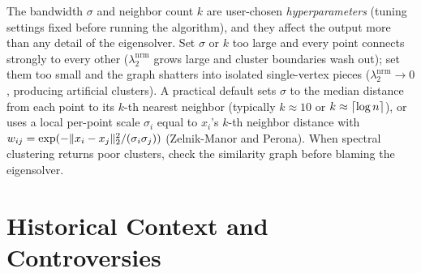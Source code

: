 \begin{trapbox}
The bandwidth $\sigma$ and neighbor count $k$ are user-chosen \emph{hyperparameters} (tuning settings fixed before running the algorithm), and they affect the output more than any detail of the eigensolver. Set $\sigma$ or $k$ too large and every point connects strongly to every other ($\lambda_2^{\mathrm{nrm}}$ grows large and cluster boundaries wash out); set them too small and the graph shatters into isolated single-vertex pieces ($\lambda_2^{\mathrm{nrm}} \to 0$, producing artificial clusters). A practical default sets $\sigma$ to the median distance from each point to its $k$-th nearest neighbor (typically $k \approx 10$ or $k \approx \lceil\log n\rceil$), or uses a local per-point scale $\sigma_i$ equal to $x_i$'s $k$-th neighbor distance with $w_{ij} = \exp(-\lVert x_i-x_j\rVert_2^2 / (\sigma_i\sigma_j))$ (Zelnik-Manor and Perona). When spectral clustering returns poor clusters, check the similarity graph before blaming the eigensolver.
\end{trapbox}

\section{Historical Context and Controversies}
\label{ch33:history-context}

